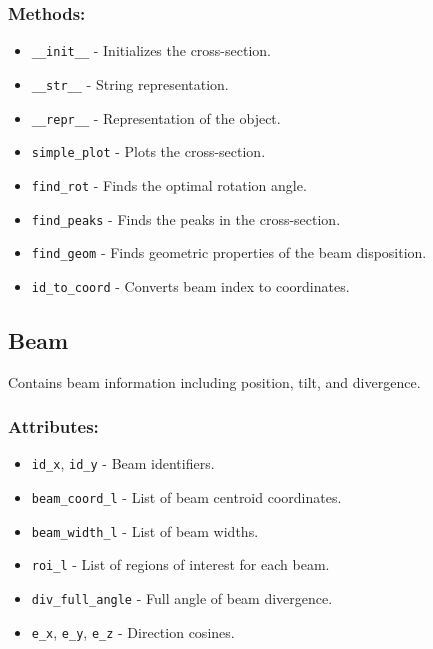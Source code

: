 \documentclass{article}
\begin{document}
\subsubsection*{Methods:}
\begin{itemize}
    \item \texttt{\_\_init\_\_} - Initializes the cross-section.
    \item \texttt{\_\_str\_\_} - String representation.
    \item \texttt{\_\_repr\_\_} - Representation of the object.
    \item \texttt{simple\_plot} - Plots the cross-section.
    \item \texttt{find\_rot} - Finds the optimal rotation angle.
   

 \item \texttt{find\_peaks} - Finds the peaks in the cross-section.
    \item \texttt{find\_geom} - Finds geometric properties of the beam disposition.
    \item \texttt{id\_to\_coord} - Converts beam index to coordinates.
\end{itemize}

\subsection{Beam}
Contains beam information including position, tilt, and divergence.
\subsubsection*{Attributes:}
\begin{itemize}
    \item \texttt{id\_x}, \texttt{id\_y} - Beam identifiers.
    \item \texttt{beam\_coord\_l} - List of beam centroid coordinates.
    \item \texttt{beam\_width\_l} - List of beam widths.
    \item \texttt{roi\_l} - List of regions of interest for each beam.
    \item \texttt{div\_full\_angle} - Full angle of beam divergence.
    \item \texttt{e\_x}, \texttt{e\_y}, \texttt{e\_z} - Direction cosines.
\end{itemize}
\end{document}
